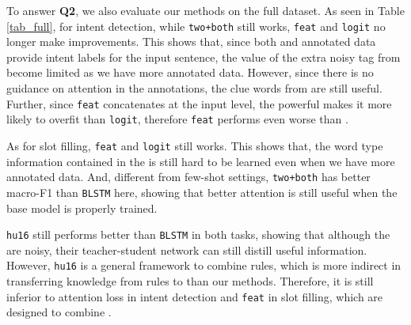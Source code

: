 To answer \textbf{Q2}, we also evaluate our methods on the full dataset.
As seen in Table \ref{tab_full}, for intent detection, while \texttt{two+both} still works, \texttt{feat} and \texttt{logit} no longer make improvements.
This shows that, since both \REtag and annotated data provide intent labels for the input sentence, the value of the extra noisy tag from \RE become limited as we have more annotated data.
However, since there is no guidance on attention in the annotations, the clue words from \RE are still useful.
Further, since \texttt{feat} concatenates \REtags at the input level, the powerful \NN makes it more likely to overfit than \texttt{logit}, therefore \texttt{feat} performs even worse than \BLSTM.

As for slot filling, \texttt{feat} and \texttt{logit} still works.
This shows that, the word type information contained in the \REtags is still hard to be learned even when we have more annotated data.
And, different from few-shot settings, \texttt{two+both} has better macro-F1 than \texttt{BLSTM} here, showing that better attention is still useful when the base model is properly trained.

\texttt{hu16} still performs better than \texttt{BLSTM} in both tasks, showing that although the \REtags are noisy, their teacher-student network can still distill useful information.
However, \texttt{hu16} is a general framework to combine \FOL rules, which is more indirect in transferring knowledge from rules to \NN than our methods. Therefore, it is still  inferior to attention loss in intent detection and \texttt{feat} in slot filling, which are designed to combine \REs.

